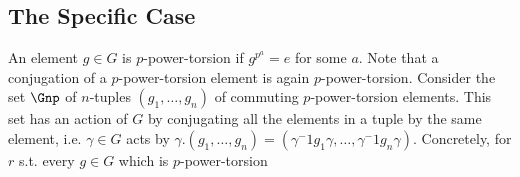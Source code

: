\subsection{The Specific Case}

An element $g \in G$ is $p$-power-torsion if $g^{p^a} = e$ for some $a$.
Note that a conjugation of a $p$-power-torsion element is again $p$-power-torsion.
Consider the set $\Gnp$ of $n$-tuples $\left(g_1, \dotsc, g_n\right)$ of commuting $p$-power-torsion elements.
This set has an action of $G$ by conjugating all the elements in a tuple by the same element, i.e. $\gamma \in G$ acts by $\gamma. \left(g_1, \dotsc, g_n\right) = \left(\gamma^-1 g_1 \gamma, \dotsc, \gamma^-1 g_n \gamma\right)$.
Concretely, for $r$ s.t. every $g \in G$ which is $p$-power-torsion
